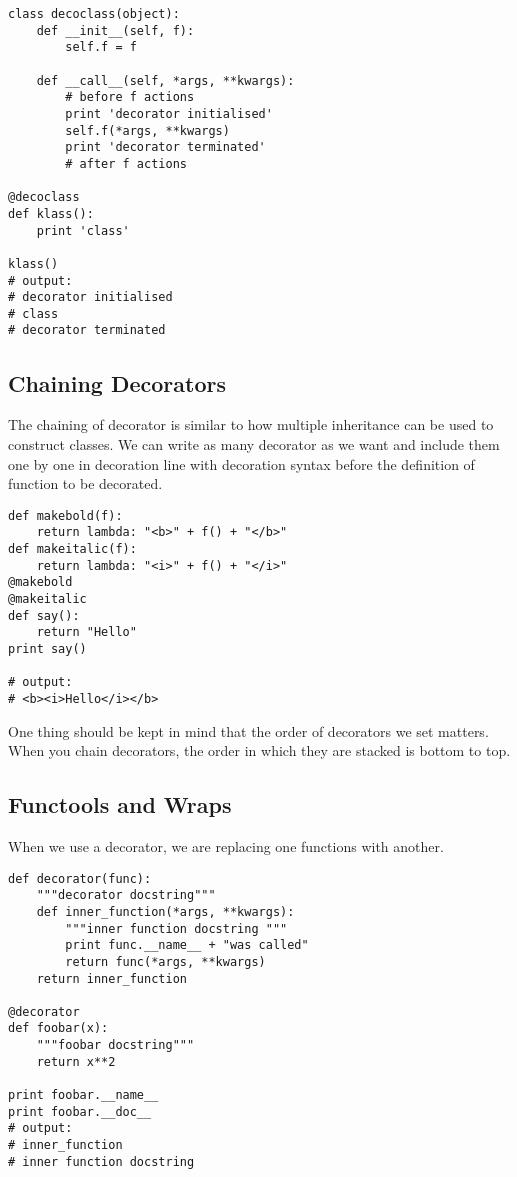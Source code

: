 \begin{verbatim}
class decoclass(object):
    def __init__(self, f):
        self.f = f

    def __call__(self, *args, **kwargs):
        # before f actions
        print 'decorator initialised'
        self.f(*args, **kwargs)
        print 'decorator terminated'
        # after f actions

@decoclass
def klass():
    print 'class'

klass()
# output:
# decorator initialised
# class
# decorator terminated
\end{verbatim}

\subsection{Chaining Decorators}
The chaining of decorator is similar to how multiple inheritance can be used to construct classes. We can write as many decorator as we want and include them one by one in decoration line with decoration syntax before the definition of function to be decorated.

\begin{verbatim}
def makebold(f):
    return lambda: "<b>" + f() + "</b>"
def makeitalic(f):
    return lambda: "<i>" + f() + "</i>"
@makebold
@makeitalic
def say():
    return "Hello"
print say()

# output:
# <b><i>Hello</i></b>
\end{verbatim}
One thing should be kept in mind that the order of decorators we set matters. When you chain decorators, the order in which they are stacked is bottom to top.

\subsection{Functools and Wraps}
When we use a decorator, we are replacing one functions with another.

\begin{verbatim}
def decorator(func):
    """decorator docstring"""
    def inner_function(*args, **kwargs):
        """inner function docstring """
        print func.__name__ + "was called"
        return func(*args, **kwargs)
    return inner_function

@decorator
def foobar(x):
    """foobar docstring"""
    return x**2

print foobar.__name__
print foobar.__doc__
# output:
# inner_function
# inner function docstring
\end{verbatim}

